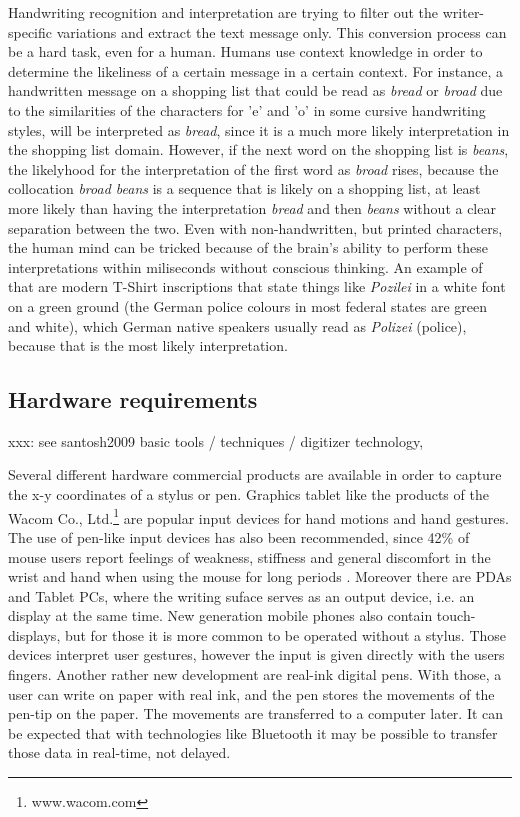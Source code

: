 Handwriting recognition and interpretation are trying to filter out the 
writer-specific variations and extract the text message only. This conversion
process can be a hard task, even for a human. Humans use context knowledge
in order to determine the likeliness of a certain message in a certain context.
For instance, a handwritten message on a shopping list that could be read
as \emph{bread} or \emph{broad} due to the similarities of the characters 
for 'e' and 'o' in some cursive handwriting styles, will be interpreted 
as \emph{bread}, since it is a much more likely interpretation in the 
shopping list domain. However, if the next word on the shopping list 
is \emph{beans}, the likelyhood for the interpretation of the first word
as \emph{broad} rises, because the collocation \emph{broad beans} is a
sequence that is likely on a shopping list, at least more likely than
having the interpretation \emph{bread} and then \emph{beans} without a
clear separation between the two. Even with non-handwritten, 
but printed characters, the human mind can be tricked because of the 
brain's ability to perform these interpretations within miliseconds 
without conscious thinking. An example of that are modern T-Shirt inscriptions
that state things like \emph{Pozilei} in a white font on a green ground 
(the German police colours in most federal states are green and white), 
which German native speakers usually read as \emph{Polizei} (police),
because that is the most likely interpretation.

\subsection{Hardware requirements}
\label{sec:hardwarerequirements}
xxx: see santosh2009 basic tools / techniques / digitizer technology, 

Several different hardware commercial products are available in order to
capture the x-y coordinates of a stylus or pen. Graphics tablet like the
products of the Wacom Co., Ltd.\footnote{www.wacom.com} are popular input
devices for hand motions and hand gestures. The use of pen-like input devices 
has also been recommended, since 42\% of mouse users report feelings of 
weakness, stiffness and general discomfort in the wrist and hand when 
using the mouse for long periods . Moreover there are
PDAs and Tablet PCs, where the writing suface serves as an output device,
i.e. an display at the same time. New generation mobile phones also contain
touch-displays, but for those it is more common to be operated without a 
stylus. Those devices interpret user gestures, however the input is given 
directly with the users fingers. Another rather new development are real-ink 
digital pens. With those, a user can write on paper with real ink, and the pen
stores the movements of the pen-tip on the paper. The movements are transferred 
to a computer later. It can be expected that with technologies like Bluetooth
it may be possible to transfer those data in real-time, not delayed.

